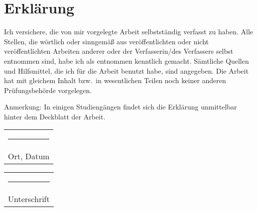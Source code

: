 \chapter*{Erklärung}
%
Ich versichere, die von mir vorgelegte Arbeit selbstständig verfasst zu haben. Alle Stellen, die wörtlich oder sinngemäß aus veröffentlichten oder nicht veröffentlichten Arbeiten anderer oder der Verfasserin/des Verfassers selbst entnommen sind, habe ich als entnommen kenntlich gemacht. Sämtliche Quellen und Hilfsmittel, die ich für die Arbeit benutzt habe, sind angegeben. Die Arbeit hat mit gleichem Inhalt bzw.\ in wesentlichen Teilen noch keiner anderen Prüfungsbehörde vorgelegen.
\par
Anmerkung: In einigen Studiengängen findet sich die Erklärung unmittelbar hinter dem Deckblatt der Arbeit.
\\[3cm]
%
\begin{tabular}{@{}l@{}}%
\rule{0.35\textwidth}{0.4pt}\\
Ort, Datum%
\end{tabular}%
\hfill%
\begin{tabular}{@{}l@{}}%
\rule{0.45\textwidth}{0.4pt}\\
Unterschrift%
\end{tabular}%